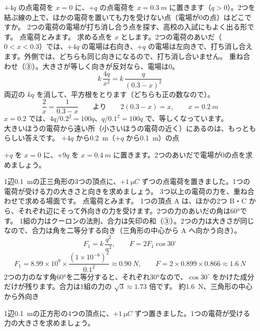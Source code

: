 \label{ph:電-1:ex5}
\begin{phreidai}[力が0になる点]
$+4q$ の点電荷を $x=0$ に、$+q$ の点電荷を $x=\qty{0.3}{m}$ に置きます（$q>0$）。2つを結ぶ線の上で、ほかの電荷を置いても力を受けない点（電場が0の点）はどこですか。
\phbamen
2つの電荷の電場が打ち消し合う点を探す、高校の入試にもよく出る形です。
\phmushi
点電荷とみます。
\phzu
求める点を $x$ とします。2つの電荷のあいだ（$0<x<0.3$）では、$+4q$ の電場は右向き、$+q$ の電場は左向きで、打ち消し合えます。外側では、どちらも同じ向きになるので、打ち消し合いません。
\phriyu
重ね合わせ（③）。大きさが等しく向きが反対なら、電場は0。
\phtateru
\[k\,\frac{4q}{x^2}=k\,\frac{q}{(0.3-x)^2}\]
\phtoku
両辺の $kq$ を消して、平方根をとります（どちらも正の数なので）。
\[\frac{2}{x}=\frac{1}{0.3-x}\qquad\text{より}\qquad2(0.3-x)=x,\qquad x=\qty{0.2}{m}\]
\phtashikame
$x=0.2$ では、$4q/0.2^2=100q$、$q/0.1^2=100q$ で、等しくなっています。\\
大きいほうの電荷から遠い所（小さいほうの電荷の近く）にあるのは、もっともらしい答えです。
\kotae $+4q$ から\qty{0.2}{m}（$+q$ から\qty{0.1}{m}）の点
\end{phreidai}
\begin{jibun}
$+q$ を $x=0$ に、$+9q$ を $x=\qty{0.4}{m}$ に置きます。2つのあいだで電場が0の点を求めましょう。
\end{jibun}

\label{ph:電-1:ex6}
\begin{phreidai}[正三角形の頂点の電荷]
1辺\qty{0.1}{m}の正三角形の3つの頂点に、$+\qty{1}{\micro C}$ ずつの点電荷を置きました。1つの電荷が受ける力の大きさと向きを求めましょう。
\phbamen
3つ以上の電荷の力を、重ね合わせで求める場面です。
\phmushi
点電荷とみます。
\phzu
1つの頂点 A は、ほかの2つ B・C から、それぞれ辺にそって外向きの力を受けます。2つの力のあいだの角は60°です。
\phriyu
1組の力はクーロンの法則、合力は矢印の和（③）。2つの力は大きさが同じなので、合力は角を二等分する向き（三角形の中心から A へ向かう向き）。
\phtateru
\[F_1=k\,\frac{q^2}{a^2},\qquad F=2F_1\cos30^\circ\]
\phtoku
\[F_1=8.99\times10^9\times\frac{(1\times10^{-6})^2}{0.1^2}\approx\qty{0.90}{N},\qquad F=2\times0.899\times0.866\approx\qty{1.6}{N}\]
\phtashikame
2つの力のなす角60°を二等分すると、それぞれ30°なので、$\cos30^\circ$ をかけた成分だけが残ります。合力は1組の力の $\sqrt3\approx1.73$ 倍です。
\kotae 約\qty{1.6}{N}、三角形の中心から外向き
\end{phreidai}
\begin{jibun}
1辺\qty{0.1}{m}の正方形の4つの頂点に、$+\qty{1}{\micro C}$ ずつ置きました。1つの電荷が受ける力の大きさを求めましょう。
\end{jibun}

